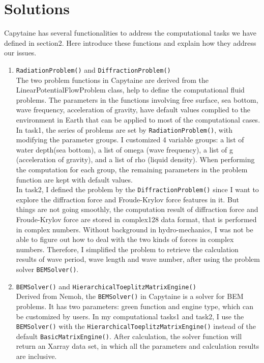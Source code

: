 \documentclass{article}
\begin{document}
\section{Solutions}
Capytaine has several functionalities to address the computational tasks we have defined in section2. Here introduce these functions and explain how they address our issues.
\begin{enumerate}
    \item \texttt{RadiationProblem()} and \texttt{DiffractionProblem()}\\
    The two problem functions in Capytaine are derived from the LinearPotentialFlowProblem class\cite{documentation}, help to define the computational fluid problems. The parameters in the functions involving free surface, sea bottom, wave frequency, acceleration of gravity, have default values complied to the environment in Earth that can be applied to most of the computational cases. \\
    In task1, the series of problems are set by \texttt{RadiationProblem()}, with modifying the parameter groups. I customized 4 variable groups: a list of water depth(sea bottom), a list of omega (wave frequency), a list of g (acceleration of gravity), and a list of rho (liquid density). When performing the computation for each group, the remaining parameters in the problem function are kept with default values. \\
    In task2, I defined the problem by the \texttt{DiffractionProblem()} since I want to explore the diffraction force and Froude-Krylov force features in it. But things are not going smoothly, the computation result of diffraction force and Froude-Krylov force are stored in complex128 data format, that is performed in complex numbers. Without background in hydro-mechanics, I was not be able to figure out how to deal with the two kinds of forces in complex numbers. Therefore, I simplified the problem to retrieve the calculation results of wave period, wave length and wave number, after using the problem solver \texttt{BEMSolver()}.
    \item \texttt{BEMSolver()} and \texttt{HierarchicalToeplitzMatrixEngine()}\\
    Derived from Nemoh, the \texttt{BEMSolver()} in Capytaine is a solver for BEM problems\cite{documentation}. It has two parameters: green function and engine type, which can be customized by users. In my computational tasks1 and task2, I use the \texttt{BEMSolver()} with the \texttt{HierarchicalToeplitzMatrixEngine()} instead of the default \texttt{BasicMatrixEngine()}. After calculation, the solver function will return an Xarray data set, in which all the parameters and calculation results are inclusive.

\end{enumerate}
\end{document}

